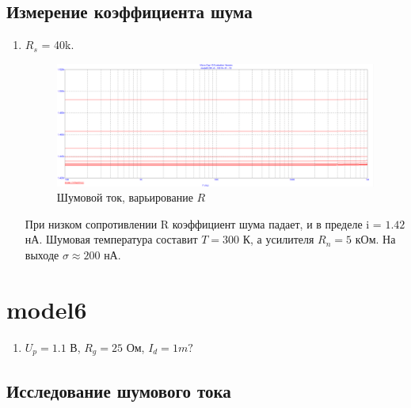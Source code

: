 \documentclass[a4paper, 12pt]{article}%
\begin{document}
\subsection*{Измерение коэффициента шума}

\begin{enumerate}
\item

\FloatBarrier
$R_s$ = 40k.

\begin{figure}[h!]
    \centering
    \includegraphics[scale=0.3]{images/2023-11-23_17-00-00.png}
    \caption{Шумовой ток, варьирование $R$}
    \label{fig:m612}
\end{figure}

При низком сопротивлении R коэффициент шума падает, и в пределе  i = $1.42$ нА. Шумовая температура составит $T = 300$ К, а усилителя $R_n = 5$ кОм. На выходе $\sigma \approx 200$ нА.


\end{enumerate}

\section{\textbf{model6}}

\begin{enumerate}

\item

$U_p = 1.1$ В, $R_g = 25$ Ом, $I_d = 1m?$
\FloatBarrier


\end{enumerate}

\subsection*{Исследование шумового тока}
\end{document}
